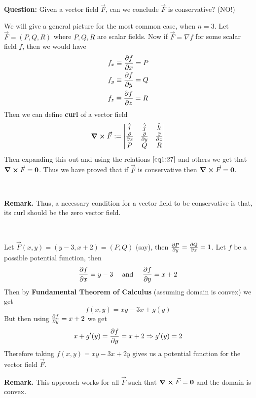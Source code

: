 \documentclass[../Analysis-3]{subfiles}
\begin{document}
\textbf{Question:} Given a vector field $\vec{F}$, can we conclude $\vec{F}$ is conservative? (NO!)

We will give a general picture for the most common case, when $n = 3$. Let $\vec{F} = (P,Q,R)$ where $P,Q,R$ are scalar fields. Now if $\vec{F} = \nabla f$ for some scalar field $f$, then we would have
\begin{align}\label{eq1:27}
     & f_x \equiv \pdv{f}{x} = P \\
     & f_y \equiv \pdv{f}{y} = Q \\
     & f_z \equiv \pdv{f}{z} = R
\end{align}
Then we can define \textbf{curl} of a vector field
\[
    \curl \vec{F} := \begin{vmatrix}
        \hat{i}   & \hat{j}   & \hat{k}   \\
        \pdv{}{x} & \pdv{}{y} & \pdv{}{z} \\
        P         & Q         & R
    \end{vmatrix}
\]
Then expanding this out and using the relations $\ref{eq1:27}$ and others we get that $\curl \vec{F} = \mathbf{0}$. Thus we have proved that if $\vec{F}$ is conservative then $\curl \vec{F} = \mathbf{0}$.

\

\textbf{Remark.} Thus, a necessary condition for a vector field to be conservative is that, its curl should be the zero vector field.

\

\begin{Eg}{}{}
    Let $\vec{F}(x,y) = (y-3,x+2) = (P,Q)$ (say), then $\pdv{P}{y} = \pdv{Q}{x} = 1$. Let $f$ be a possible potential function, then
    \[
        \pdv{f}{x} = y-3 \quad \mbox{ and } \quad \pdv{f}{y} = x+2
    \]
    Then by \textbf{Fundamental Theorem of Calculus} (assuming domain is convex) we get
    \[
        f(x,y) = xy - 3x + g(y)
    \]
    But then using $\pdv{f}{y} = x+2$ we get
    \[
        x + g'(y) = \pdv{f}{y} = x+2 \Rightarrow g'(y) = 2
    \]
    Therefore taking $f(x,y) = xy - 3x + 2y$ gives us a potential function for the vector field $\vec{F}$.
\end{Eg}


\textbf{Remark.} This approach works for all $\vec{F}$ such that $\curl \vec{F} = \mathbf{0}$ and the domain is convex.
\end{document}
